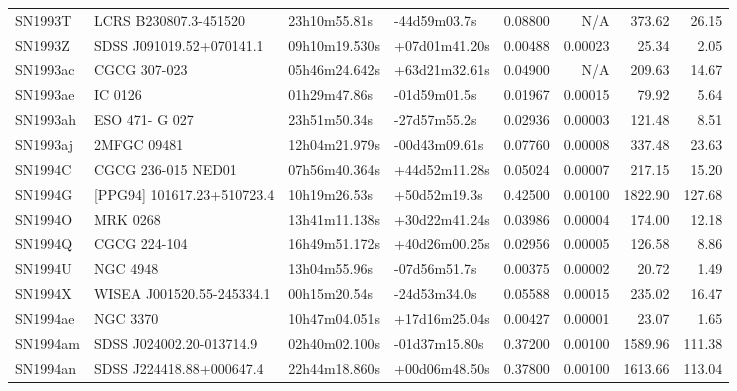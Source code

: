 \begin{longtable}{llllrrrr}
SN1993T          &           LCRS B230807.3-451520 &    23h10m55.81s &    -44d59m03.7s &  0.08800 &      N/A &   373.62 &       26.15 \\
SN1993Z          &        SDSS J091019.52+070141.1 &   09h10m19.530s &   +07d01m41.20s &  0.00488 &  0.00023 &    25.34 &        2.05 \\
SN1993ac         &                    CGCG 307-023 &   05h46m24.642s &   +63d21m32.61s &  0.04900 &      N/A &   209.63 &       14.67 \\
SN1993ae         &                         IC 0126 &    01h29m47.86s &    -01d59m01.5s &  0.01967 &  0.00015 &    79.92 &        5.64 \\
SN1993ah         &                  ESO 471- G 027 &    23h51m50.34s &    -27d57m55.2s &  0.02936 &  0.00003 &   121.48 &        8.51 \\
SN1993aj         &                     2MFGC 09481 &   12h04m21.979s &   -00d43m09.61s &  0.07760 &  0.00008 &   337.48 &       23.63 \\
SN1994C          &              CGCG 236-015 NED01 &   07h56m40.364s &   +44d52m11.28s &  0.05024 &  0.00007 &   217.15 &       15.20 \\
SN1994G          &      [PPG94] 101617.23+510723.4 &    10h19m26.53s &    +50d52m19.3s &  0.42500 &  0.00100 &  1822.90 &      127.68 \\
SN1994O          &                        MRK 0268 &   13h41m11.138s &   +30d22m41.24s &  0.03986 &  0.00004 &   174.00 &       12.18 \\
SN1994Q          &                    CGCG 224-104 &   16h49m51.172s &   +40d26m00.25s &  0.02956 &  0.00005 &   126.58 &        8.86 \\
SN1994U          &                        NGC 4948 &    13h04m55.96s &    -07d56m51.7s &  0.00375 &  0.00002 &    20.72 &        1.49 \\
SN1994X          &       WISEA J001520.55-245334.1 &    00h15m20.54s &    -24d53m34.0s &  0.05588 &  0.00015 &   235.02 &       16.47 \\
SN1994ae         &                        NGC 3370 &   10h47m04.051s &   +17d16m25.04s &  0.00427 &  0.00001 &    23.07 &        1.65 \\
SN1994am         &        SDSS J024002.20-013714.9 &   02h40m02.100s &   -01d37m15.80s &  0.37200 &  0.00100 &  1589.96 &      111.38 \\
SN1994an         &        SDSS J224418.88+000647.4 &   22h44m18.860s &   +00d06m48.50s &  0.37800 &  0.00100 &  1613.66 &      113.04 \\

\end{longtable}

